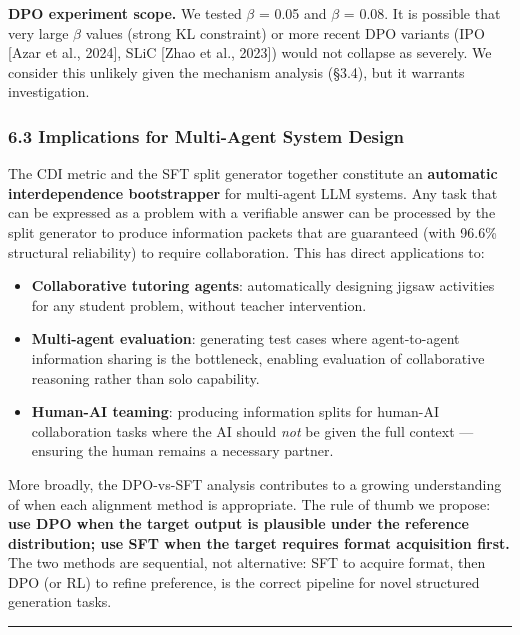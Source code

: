 \documentclass[
  11pt,
]{article}
\providecommand{\tightlist}{%
  \setlength{\itemsep}{0pt}\setlength{\parskip}{0pt}}
\begin{document}
\textbf{DPO experiment scope.} We tested $\beta$ = 0.05 and $\beta$ = 0.08. It is
possible that very large $\beta$ values (strong KL constraint) or more recent
DPO variants (IPO [Azar et al., 2024], SLiC [Zhao et al., 2023]) would not collapse as severely. We consider this unlikely
given the mechanism analysis (§3.4), but it warrants investigation.

\subsubsection{6.3 Implications for Multi-Agent System
Design}\label{implications-for-multi-agent-system-design}

The CDI metric and the SFT split generator together constitute an
\textbf{automatic interdependence bootstrapper} for multi-agent LLM
systems. Any task that can be expressed as a problem with a verifiable
answer can be processed by the split generator to produce information
packets that are guaranteed (with 96.6\% structural reliability) to
require collaboration. This has direct applications to:

\begin{itemize}
\tightlist
\item
  \textbf{Collaborative tutoring agents}: automatically designing jigsaw
  activities for any student problem, without teacher intervention.
\item
  \textbf{Multi-agent evaluation}: generating test cases where
  agent-to-agent information sharing is the bottleneck, enabling
  evaluation of collaborative reasoning rather than solo capability.
\item
  \textbf{Human-AI teaming}: producing information splits for human-AI
  collaboration tasks where the AI should \emph{not} be given the full
  context --- ensuring the human remains a necessary partner.
\end{itemize}

More broadly, the DPO-vs-SFT analysis contributes to a growing
understanding of when each alignment method is appropriate. The rule of
thumb we propose: \textbf{use DPO when the target output is plausible
under the reference distribution; use SFT when the target requires
format acquisition first.} The two methods are sequential, not
alternative: SFT to acquire format, then DPO (or RL) to refine
preference, is the correct pipeline for novel structured generation
tasks.

\begin{center}\rule{0.5\linewidth}{0.5pt}\end{center}
\end{document}
